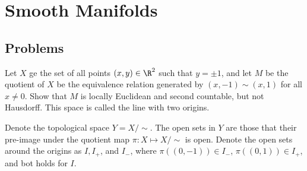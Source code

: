 \chapter{Smooth Manifolds}


\section{Problems}
\begin{problem}
	Let $ X $ ge the set of all points $ (x,y) \in \R^2 $ such that $ y = \pm 1 $, and let $ M $ be the quotient of $ X $ be the equivalence relation generated by $ (x,-1) \sim (x,1) $ for all $ x\neq 0 $. Show that $ M $ is locally Euclidean and second countable, but not Hausdorff. This space is called the line with two origins.
\end{problem}

\begin{solution}
	Denote the topological space $ Y = X/\sim $. The open sets in $ Y $ are those that their pre-image under the quotient map $ \pi: X \mapsto X/\sim $ is open. Denote the open sets around the origins as $ I, I_+ $, and $ I_- $, where $ \pi((0,-1)) \in I_- $, $ \pi((0,1))\in I_+ $, and bot holds for $ I $.
\end{solution}